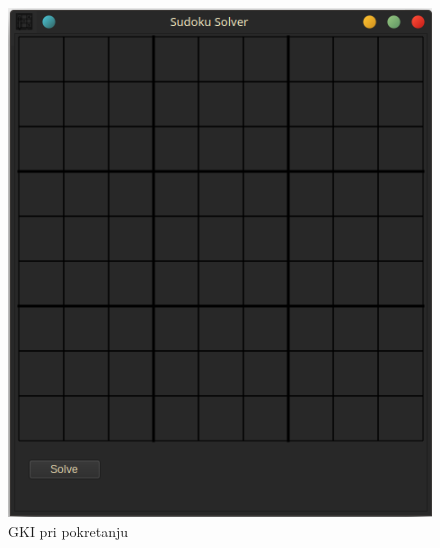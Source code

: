 \documentclass[a4paper]{article}
\begin{document}
{\begin{figure}[h!]
  \centering
  \begin{minipage}{0.45\textwidth}
      \centering
      \includegraphics[width=\linewidth]{slike/app_start.png}
      \caption{GKI pri pokretanju}
      \label{fig:app_start}
  \end{minipage}\hfill
  \begin{minipage}{0.45\textwidth}
      \centering

\end{minipage}
\end{figure}}
\end{document}
